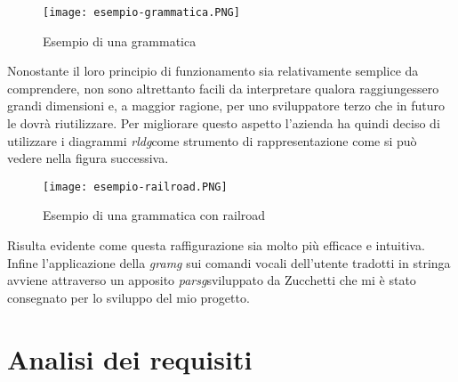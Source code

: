 \begin{figure}[htbp]
	\begin{center}
		\texttt{[image: esempio-grammatica.PNG]}
		\caption{Esempio di una grammatica}
	\end{center}
\end{figure}

\vspace{2cm}

Nonostante il loro principio di funzionamento sia relativamente semplice da comprendere, non sono altrettanto facili da interpretare qualora raggiungessero grandi dimensioni e, a maggior ragione, per uno sviluppatore terzo che in futuro le dovrà riutilizzare. Per migliorare questo aspetto l'azienda ha quindi deciso di utilizzare i diagrammi \emph{\gls{rldg}}\glsfirstoccur come strumento di rappresentazione come si può vedere nella figura successiva.

\begin{figure}[htbp]
	\begin{center}
		\texttt{[image: esempio-railroad.PNG]}
		\caption{Esempio di una grammatica con railroad}
	\end{center}
\end{figure}

Risulta evidente come questa raffigurazione sia molto più efficace e intuitiva. \\
Infine l'applicazione della \emph{\gls{gramg}} sui comandi vocali dell'utente tradotti in stringa avviene attraverso un apposito \emph{\gls{parsg}}\glsfirstoccur sviluppato da Zucchetti che mi è stato consegnato per lo sviluppo del mio progetto.
\section{Analisi dei requisiti}
